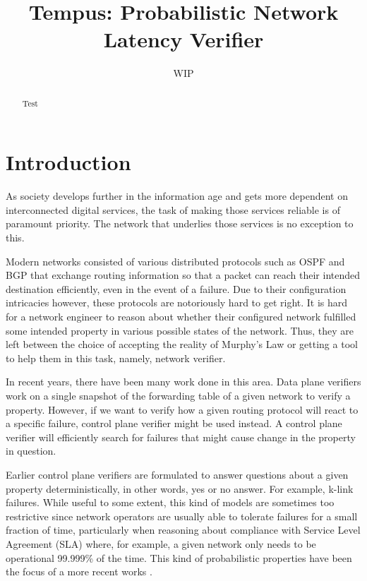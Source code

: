 \documentclass[10pt,sigconf,letterpaper,anonymous,nonacm]{acmart}
\title{Tempus: Probabilistic Network Latency Verifier}
\author{WIP}
\begin{document}
\begin{abstract}
    Test
\end{abstract}

\maketitle

\section{Introduction}
As society develops further in the information age and gets more dependent on interconnected 
digital services, the task of making those services reliable is of paramount priority.
The network that underlies those services is no exception to this. 

Modern networks consisted of various distributed protocols such as OSPF and BGP that exchange 
routing information so that a packet can reach their intended destination efficiently, even in the 
event of a failure.
Due to their configuration intricacies however, these protocols are notoriously hard to get right. 
It is hard for a network engineer to reason about whether their configured network fulfilled some 
intended property in various possible states of the network. 
Thus, they are left between the choice of accepting the reality of Murphy's Law or getting a tool 
to help them in this task, namely, network verifier.

In recent years, there have been many work done in this area. 
Data plane verifiers work on a single snapshot of the forwarding table of a given network to 
verify a property. 
However, if we want to verify how a given routing protocol will react to a specific failure, 
control plane verifier might be used instead. 
A control plane verifier will efficiently search for failures that might cause change in the 
property in question.

Earlier control plane verifiers are formulated to answer questions about a given property 
deterministically, in other words, yes or no answer. 
For example, k-link failures.
While useful to some extent, this kind of models are sometimes too restrictive since network 
operators are usually able to tolerate failures for a small fraction of time, particularly when 
reasoning about compliance with Service Level Agreement (SLA) where, for example, a given network 
only needs to be operational 99.999\% of the time. 
This kind of probabilistic properties have been the focus of a more recent works
\cite{steffen2020probabilistic}.
\end{document}
